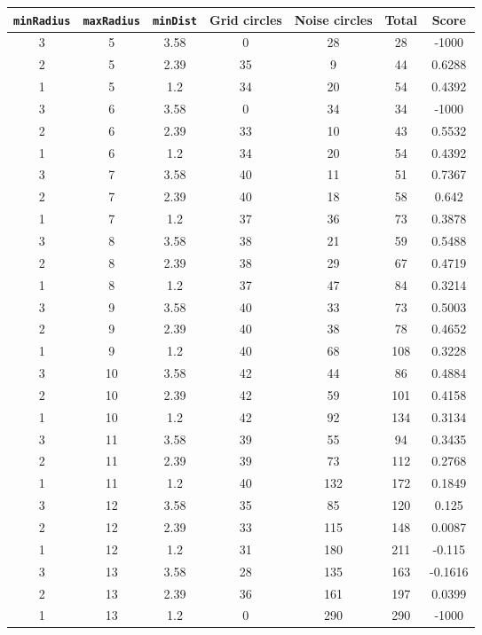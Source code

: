\documentclass[letterpaper, 12pt]{article}
\begin{document}
\begin{longtable}{|c|c|c|c|c|c|c|}
\hline
\textbf{\texttt{minRadius}} & \textbf{\texttt{maxRadius}} & \textbf{\texttt{minDist}} & \textbf{Grid circles} & \textbf{Noise circles} & \textbf{Total} & \textbf{Score} \\
\hline
3 & 5 & 3.58 & 0 & 28 & 28 & -1000 \\
\hline
2 & 5 & 2.39 & 35 & 9 & 44 & 0.6288 \\
\hline
1 & 5 & 1.2 & 34 & 20 & 54 & 0.4392 \\
\hline
3 & 6 & 3.58 & 0 & 34 & 34 & -1000 \\
\hline
2 & 6 & 2.39 & 33 & 10 & 43 & 0.5532 \\
\hline
1 & 6 & 1.2 & 34 & 20 & 54 & 0.4392 \\
\hline
3 & 7 & 3.58 & 40 & 11 & 51 & 0.7367 \\
\hline
2 & 7 & 2.39 & 40 & 18 & 58 & 0.642 \\
\hline
1 & 7 & 1.2 & 37 & 36 & 73 & 0.3878 \\
\hline
3 & 8 & 3.58 & 38 & 21 & 59 & 0.5488 \\
\hline
2 & 8 & 2.39 & 38 & 29 & 67 & 0.4719 \\
\hline
1 & 8 & 1.2 & 37 & 47 & 84 & 0.3214 \\
\hline
3 & 9 & 3.58 & 40 & 33 & 73 & 0.5003 \\
\hline
2 & 9 & 2.39 & 40 & 38 & 78 & 0.4652 \\
\hline
1 & 9 & 1.2 & 40 & 68 & 108 & 0.3228 \\
\hline
3 & 10 & 3.58 & 42 & 44 & 86 & 0.4884 \\
\hline
2 & 10 & 2.39 & 42 & 59 & 101 & 0.4158 \\
\hline
1 & 10 & 1.2 & 42 & 92 & 134 & 0.3134 \\
\hline
3 & 11 & 3.58 & 39 & 55 & 94 & 0.3435 \\
\hline
2 & 11 & 2.39 & 39 & 73 & 112 & 0.2768 \\
\hline
1 & 11 & 1.2 & 40 & 132 & 172 & 0.1849 \\
\hline
3 & 12 & 3.58 & 35 & 85 & 120 & 0.125 \\
\hline
2 & 12 & 2.39 & 33 & 115 & 148 & 0.0087 \\
\hline
1 & 12 & 1.2 & 31 & 180 & 211 & -0.115 \\
\hline
3 & 13 & 3.58 & 28 & 135 & 163 & -0.1616 \\
\hline
2 & 13 & 2.39 & 36 & 161 & 197 & 0.0399 \\
\hline
1 & 13 & 1.2 & 0 & 290 & 290 & -1000 \\

\end{longtable}
\end{document}

